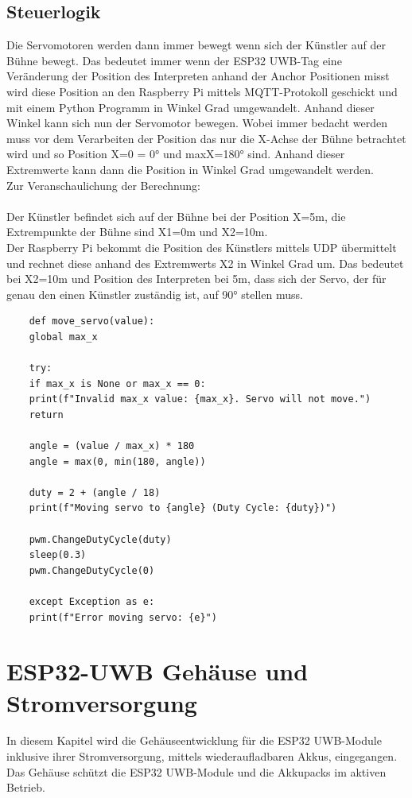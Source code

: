 \subsection{Steuerlogik}
Die Servomotoren werden dann immer bewegt wenn sich der Künstler auf der Bühne bewegt. Das bedeutet immer wenn der ESP32 UWB-Tag eine Veränderung der Position des Interpreten anhand der Anchor Positionen misst wird diese Position an den Raspberry Pi mittels MQTT-Protokoll geschickt und mit einem Python Programm in Winkel Grad umgewandelt. Anhand dieser Winkel kann sich nun der Servomotor bewegen. Wobei immer bedacht werden muss vor dem Verarbeiten der Position das nur die X-Achse der Bühne betrachtet wird und so Position X=0 = 0° und maxX=180° sind. Anhand dieser Extremwerte kann dann die Position in Winkel Grad umgewandelt werden.
\\Zur Veranschaulichung der Berechnung:\\\\
Der Künstler befindet sich auf der Bühne bei der Position X=5m, die Extrempunkte der Bühne sind X1=0m und X2=10m.\\
Der Raspberry Pi bekommt die Position des Künstlers mittels UDP übermittelt und rechnet diese anhand des Extremwerts X2 in Winkel Grad um. Das bedeutet bei X2=10m und Position des Interpreten bei 5m, dass sich der Servo, der für genau den einen Künstler zuständig ist, auf 90° stellen muss. \\

\begin{lstlisting}
	def move_servo(value):
	global max_x
	
	try:
	if max_x is None or max_x == 0:
	print(f"Invalid max_x value: {max_x}. Servo will not move.")
	return
	
	angle = (value / max_x) * 180
	angle = max(0, min(180, angle)) 
	
	duty = 2 + (angle / 18)
	print(f"Moving servo to {angle} (Duty Cycle: {duty})")
	
	pwm.ChangeDutyCycle(duty)
	sleep(0.3)
	pwm.ChangeDutyCycle(0) 
	
	except Exception as e:
	print(f"Error moving servo: {e}")
\end{lstlisting}

\section{ESP32-UWB Gehäuse und Stromversorgung}
In diesem Kapitel wird die Gehäuseentwicklung für die ESP32 UWB-Module inklusive ihrer Stromversorgung, mittels wiederaufladbaren Akkus, eingegangen. Das Gehäuse schützt die ESP32 UWB-Module und die Akkupacks im aktiven Betrieb.

